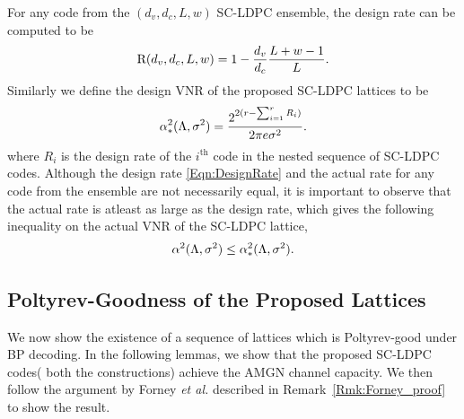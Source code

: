 \documentclass[journal,twocolumn]{IEEEtran}
\begin{document}
\begin{Discussion}
For any code from the $(d_{v},d_{c},L,w)$ SC-LDPC ensemble, the design rate can be computed to be 
\begin{align}
\text{R}(d_{v},d_{c},L,w)=1-\frac{d_{v}}{d_{c}}\frac{L+w-1}{L}.
\label{Eqn:DesignRate}
\end{align}
Similarly we define the design VNR of the proposed SC-LDPC lattices to be 
\begin{align*}
\alpha^{2}_{*}(\Lambda,\sigma^{2})=\frac{2^{2(r-\sum_{i=1}^{r}R_{i})}}{2\pi e\sigma^{2}}.
\end{align*}
where $R_{i}$ is the design rate of the $i^{\text{th}}$ code in the nested sequence of SC-LDPC codes. Although the design rate \eqref{Eqn:DesignRate} and the actual rate for any code from the ensemble are not necessarily equal, it is important to observe that the actual rate is atleast as large as the design rate, which gives the following inequality on the actual VNR of the SC-LDPC lattice,
\begin{align}
\alpha^{2}(\Lambda,\sigma^{2})\leq \alpha^{2}_{*}(\Lambda,\sigma^{2}).
\label{Eqn:VNRInequality}
\end{align}
\end{Discussion}


\subsection{Poltyrev-Goodness of the Proposed Lattices}
We now show the existence of a sequence of lattices which is Poltyrev-good under BP decoding. In the following lemmas, we show that the proposed SC-LDPC codes( both the constructions) achieve the AMGN channel capacity. We then follow the argument by Forney \textit{et al.} described in Remark~\ref{Rmk:Forney_proof} to show the result.
\end{document}

